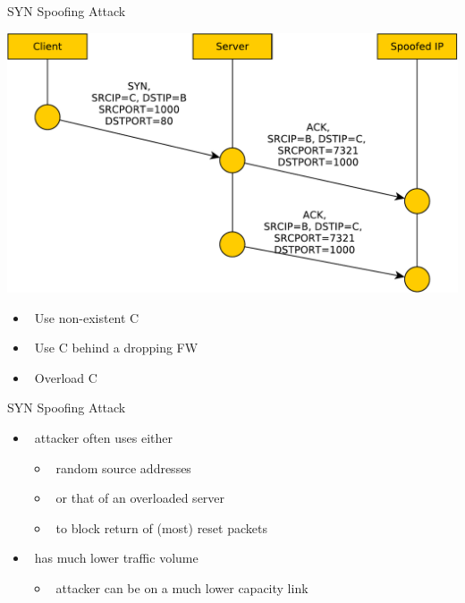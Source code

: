 \documentclass{beamer}
\begin{document}
\begin{frame}{SYN Spoofing Attack}
  \begin{center}
    \includegraphics[width=0.8\linewidth]{syn2}
  \end{center}
  \begin{itemize}
  \item  Use non-existent C
  \item  Use C behind a dropping FW
  \item  Overload C
  \end{itemize}
\end{frame}


\begin{frame}{SYN Spoofing Attack }
  \begin{itemize}
  \item  attacker often uses either 
    \begin{itemize}
    \item  random source addresses 
    \item  or that of an overloaded server 
    \item  to block return of (most) reset packets 
    \end{itemize}
  \item  has much lower traffic volume 
    \begin{itemize}
    \item  attacker can be on a much lower capacity link 
    \end{itemize}
  \end{itemize}
\end{frame}
\end{document}
